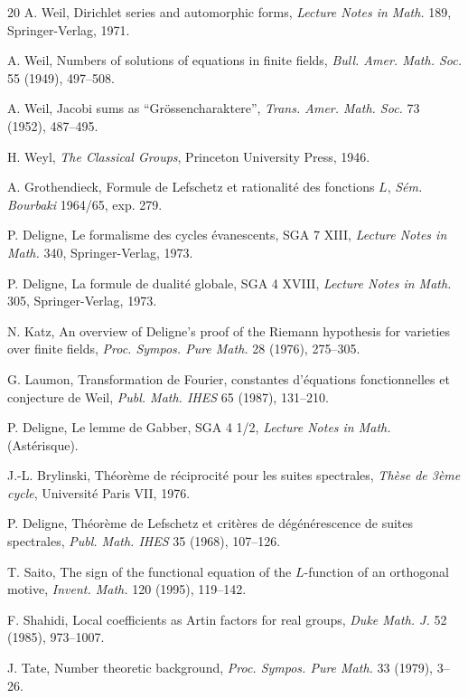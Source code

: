 \documentclass[11pt]{amsart}
\theoremstyle{plain}
\theoremstyle{definition}
\begin{document}
\begin{thebibliography}{20}
 A. Weil, Dirichlet series and automorphic forms, \textit{Lecture Notes in Math.} 189, Springer-Verlag, 1971.

 A. Weil, Numbers of solutions of equations in finite fields, \textit{Bull. Amer. Math. Soc.} 55 (1949), 497--508.

 A. Weil, Jacobi sums as ``Gr\"ossencharaktere'', \textit{Trans. Amer. Math. Soc.} 73 (1952), 487--495.

 H. Weyl, \textit{The Classical Groups}, Princeton University Press, 1946.

 A. Grothendieck, Formule de Lefschetz et rationalit\'e des fonctions $L$, \textit{S\'em. Bourbaki} 1964/65, exp. 279.

 P. Deligne, Le formalisme des cycles \'evanescents, SGA 7 XIII, \textit{Lecture Notes in Math.} 340, Springer-Verlag, 1973.

 P. Deligne, La formule de dualit\'e globale, SGA 4 XVIII, \textit{Lecture Notes in Math.} 305, Springer-Verlag, 1973.

 N. Katz, An overview of Deligne's proof of the Riemann hypothesis for varieties over finite fields, \textit{Proc. Sympos. Pure Math.} 28 (1976), 275--305.

 G. Laumon, Transformation de Fourier, constantes d'\'equations fonctionnelles et conjecture de Weil, \textit{Publ. Math. IHES} 65 (1987), 131--210.

 P. Deligne, Le lemme de Gabber, SGA 4 1/2, \textit{Lecture Notes in Math.} (Ast\'erisque).

 J.-L. Brylinski, Th\'eor\`eme de r\'eciprocit\'e pour les suites spectrales, \textit{Th\`ese de 3\`eme cycle}, Universit\'e Paris VII, 1976.

 P. Deligne, Th\'eor\`eme de Lefschetz et crit\`eres de d\'eg\'en\'erescence de suites spectrales, \textit{Publ. Math. IHES} 35 (1968), 107--126.

 T. Saito, The sign of the functional equation of the $L$-function of an orthogonal motive, \textit{Invent. Math.} 120 (1995), 119--142.

 F. Shahidi, Local coefficients as Artin factors for real groups, \textit{Duke Math. J.} 52 (1985), 973--1007.

 J. Tate, Number theoretic background, \textit{Proc. Sympos. Pure Math.} 33 (1979), 3--26.

\end{thebibliography}
\end{document}
